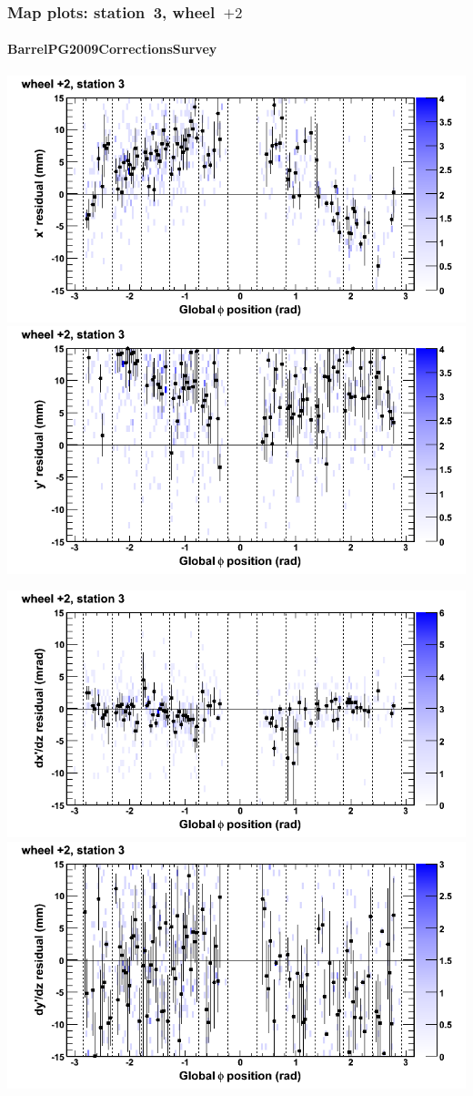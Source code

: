 \documentclass[compress]{beamer}
\begin{document}
\begin{frame}
\frametitle{Map plots: station~3, wheel~$+2$}
\framesubtitle{BarrelPG2009CorrectionsSurvey}
\includegraphics[width=0.5\linewidth]{mapplots_01/DTvsphi_st3whE_x.png}
\includegraphics[width=0.5\linewidth]{mapplots_01/DTvsphi_st3whE_y.png}

\includegraphics[width=0.5\linewidth]{mapplots_01/DTvsphi_st3whE_dxdz.png}
\includegraphics[width=0.5\linewidth]{mapplots_01/DTvsphi_st3whE_dydz.png}
\end{frame}
\end{document}

